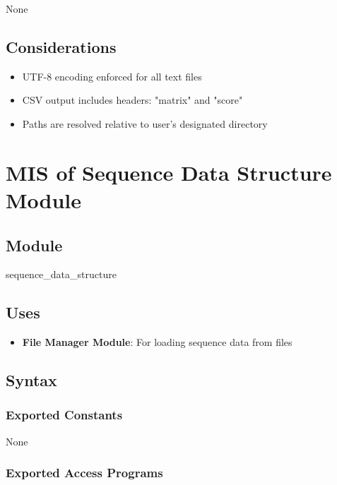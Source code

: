 \documentclass[12pt, titlepage]{article}
\begin{document}
None

\subsection{Considerations}

\begin{itemize}
    \item UTF-8 encoding enforced for all text files
    \item CSV output includes headers: "matrix" and "score"
    \item Paths are resolved relative to user's designated directory
\end{itemize}

\newpage


\section{MIS of Sequence Data Structure Module} \label{mSDS}

\subsection{Module}

sequence\_data\_structure

\subsection{Uses}

\begin{itemize}
    \item \textbf{File Manager Module}: For loading sequence data from files
\end{itemize}

\subsection{Syntax}

\subsubsection{Exported Constants}

None

\subsubsection{Exported Access Programs}
\end{document}
